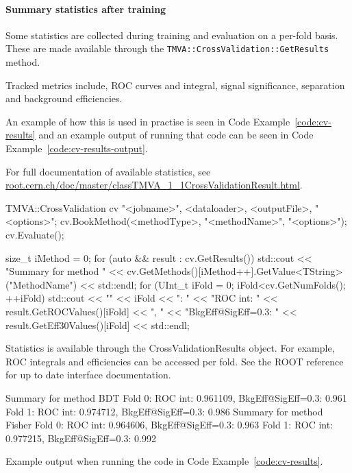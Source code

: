 \paragraph{Summary statistics after training}
\label{sec:cv-output-prog}

Some statistics are collected during training and evaluation on a per-fold basis. These are made available through the \texttt{TMVA::CrossValidation::GetResults} method.

Tracked metrics include, ROC curves and integral, signal significance, separation and background efficiencies.

An example of how this is used in practise is seen in Code Example~\ref{code:cv-results} and an example output of running that code can be seen in Code Example~\ref{code:cv-results-output}.

For full documentation of available statistics, see \url{root.cern.ch/doc/master/classTMVA_1_1CrossValidationResult.html}.

\begin{codeexample}
\begin{tmvacode}
TMVA::CrossValidation cv {"<jobname>", <dataloader>, <outputFile>, "<options>"};
cv.BookMethod(<methodType>, "<methodName>", "<options>");
cv.Evaluate();

size_t iMethod = 0;
for (auto && result : cv.GetResults()) {
   std::cout << "Summary for method "
             << cv.GetMethods()[iMethod++].GetValue<TString>("MethodName")
             << std::endl;
   for (UInt_t iFold = 0; iFold<cv.GetNumFolds(); ++iFold) {
      std::cout << "\tFold " << iFold << ": "
                << "ROC int: " << result.GetROCValues()[iFold]
                << ", "
                << "BkgEff@SigEff=0.3: " << result.GetEff30Values()[iFold]
                << std::endl;
   }
}
\end{tmvacode}
\caption[.]{\codeexampleCaptionSize Statistics is available through the CrossValidationResults object. For example, ROC integrals and efficiencies can be accessed per fold. See the ROOT reference for up to date interface documentation.}
\label{code:cv-results}
\end{codeexample}

\begin{codeexample}
\begin{tmvacode}
Summary for method BDT
   Fold 0: ROC int: 0.961109, BkgEff@SigEff=0.3: 0.961
   Fold 1: ROC int: 0.974712, BkgEff@SigEff=0.3: 0.986
Summary for method Fisher
   Fold 0: ROC int: 0.964606, BkgEff@SigEff=0.3: 0.963
   Fold 1: ROC int: 0.977215, BkgEff@SigEff=0.3: 0.992
\end{tmvacode}
\caption[.]{\codeexampleCaptionSize Example output when running the code in Code Example~\ref{code:cv-results}.}
\label{code:cv-results-output}
\end{codeexample}

